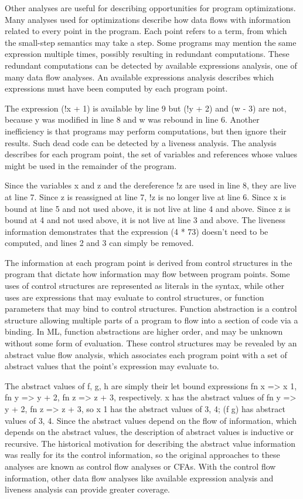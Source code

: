 Other analyses are useful for describing opportunities for program optimizations.  Many
analyses used for optimizations describe how data flows with information related to every point
in the program.  Each point refers to a term, from which the small-step semantics may take a
step.  Some programs may mention the same expression multiple times, possibly resulting in
redundant computations.  These redundant computations can be detected by available expressions
analysis, one of many data flow analyses.  An available expressions analysis describes which
expressions must have been computed by each program point.

The expression (!x + 1) is available by line 9 but (!y + 2) and (w - 3) are not, because y was
modified in line 8 and w was rebound in line 6. Another inefficiency is that programs may
perform computations, but then ignore their results.  Such dead code can be detected by a
liveness analysis.  The analysis describes for each program point, the set of variables and
references whose values might be used in the remainder of the program.

Since the variables x and z and the dereference !z are used in line 8, they are live at line
7.  Since z is reassigned at line 7, !z is no longer live at line 6.  Since x is bound at line
5 and not used above, it is not live at line 4 and above.  Since z is bound at 4 and not used
above, it is not live at line 3 and above. The liveness information demonstrates that the
expression (4 * 73) doesn't need to be computed, and lines 2 and 3 can simply be removed.

The information at each program point is derived from control structures in the program that
dictate how information may flow between program points.  Some uses of control structures are
represented as literals in the syntax, while other uses are expressions that may evaluate to
control structures, or function parameters that may bind to control structures.  Function
abstraction is a control structure allowing multiple parts of a program to flow into a section
of code via a binding.  In ML, function abstractions are higher order, and may be unknown
without some form of evaluation.  These control structures may be revealed by an abstract value
flow analysis, which associates each program point with a set of abstract values that the
point's expression may evaluate to.


The abstract values of f, g, h are simply their let bound expressions {fn x => x 1},
{fn y => y + 2},  {fn z => z + 3}, respectively.  x has the abstract values of
{fn y => y + 2, fn z => z + 3}, so x 1 has the abstract values of {3, 4}; (f g) has abstract
values of {3, 4}.  Since the abstract values depend on the flow of information, which depends
on the abstract values, the description of abstract values is inductive or recursive.  The
historical motivation for describing the abstract value information was really for its the
control information, so the original approaches to these analyses are known as control flow
analyses or CFAs.  With the control flow information, other data flow analyses like available
expression analysis and liveness analysis can provide greater coverage.

